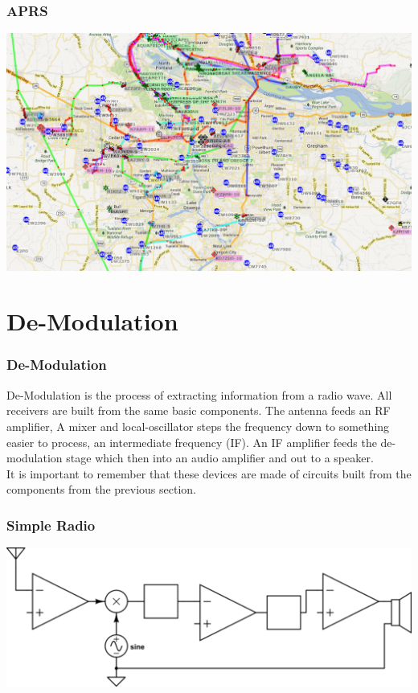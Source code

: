 \documentclass[10pt]{beamer}
\begin{document}
\begin{frame}
\frametitle{APRS}
\includegraphics[width=.9\textwidth]{aprspdx.png}
\end{frame}
\section{De-Modulation}

\begin{frame}
\frametitle{De-Modulation}
De-Modulation is the process of extracting information from a radio wave. All receivers are built from the same basic components. The antenna feeds an RF amplifier, A mixer and local-oscillator steps the frequency down to something easier to process, an intermediate frequency (IF). An IF amplifier feeds the de-modulation stage which then into an audio amplifier and out to a speaker. 
\\
It is important to remember that these devices are made of circuits built from the components from the previous section.
\end{frame}

\begin{frame}
\frametitle{Simple Radio}
\includegraphics[width=.9\textwidth]{simplereciever.png}
\end{frame}
\end{document}
